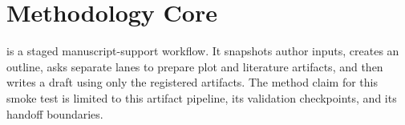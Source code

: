 \section{Methodology Core}
\SystemName{} is a staged manuscript-support workflow. It snapshots author inputs, creates an outline, asks separate lanes to prepare plot and literature artifacts, and then writes a draft using only the registered artifacts. The method claim for this smoke test is limited to this artifact pipeline, its validation checkpoints, and its handoff boundaries.
